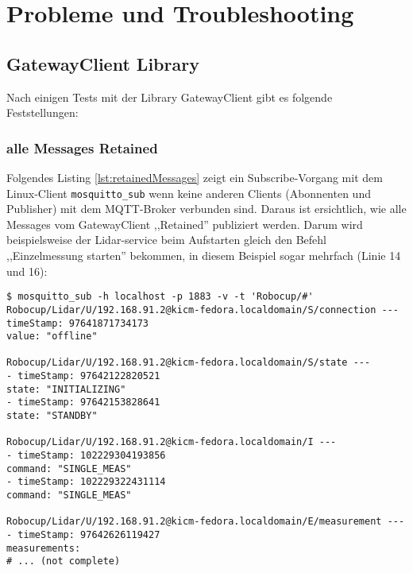 \chapter{Probleme und Troubleshooting}
\section{GatewayClient Library}

Nach einigen Tests mit der Library GatewayClient gibt es folgende Feststellungen:
\subsection{alle Messages Retained}
Folgendes Listing \ref{lst:retainedMessages} zeigt ein Subscribe-Vorgang mit dem Linux-Client \verb|mosquitto_sub| wenn keine anderen Clients (Abonnenten und Publisher) mit dem MQTT-Broker verbunden sind. Daraus ist ersichtlich, wie alle Messages vom GatewayClient ,,Retained'' publiziert werden. Darum wird beispielsweise der Lidar-service beim Aufstarten gleich den Befehl ,,Einzelmessung starten'' bekommen, in diesem Beispiel sogar mehrfach (Linie 14 und 16):
\begin{lstlisting}[caption={Subscribe mit mosquitto\_sub, Aufstartverhalten},label={lst:retainedMessages}]
$ mosquitto_sub -h localhost -p 1883 -v -t 'Robocup/#' 
Robocup/Lidar/U/192.168.91.2@kicm-fedora.localdomain/S/connection ---
timeStamp: 97641871734173
value: "offline"

Robocup/Lidar/U/192.168.91.2@kicm-fedora.localdomain/S/state ---
- timeStamp: 97642122820521
state: "INITIALIZING"
- timeStamp: 97642153828641
state: "STANDBY"

Robocup/Lidar/U/192.168.91.2@kicm-fedora.localdomain/I ---
- timeStamp: 102229304193856
command: "SINGLE_MEAS"
- timeStamp: 102229322431114       
command: "SINGLE_MEAS"

Robocup/Lidar/U/192.168.91.2@kicm-fedora.localdomain/E/measurement ---
- timeStamp: 97642626119427
measurements:
# ... (not complete)

\end{lstlisting}

